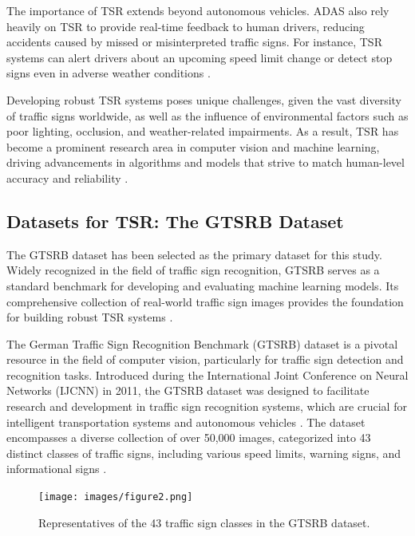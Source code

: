 The importance of TSR extends beyond autonomous vehicles. \ac{ADAS} also rely heavily 
on TSR to provide real-time feedback to human drivers, reducing accidents caused by missed or misinterpreted traffic 
signs. For instance, TSR systems can alert drivers about an upcoming speed limit change or detect stop signs even in 
adverse weather conditions \cite{Zhang2022}. 

Developing robust TSR systems poses unique challenges, given the vast diversity of traffic signs worldwide, as well 
as the influence of environmental factors such as poor lighting, occlusion, and weather-related impairments. As a result, 
TSR has become a prominent research area in computer vision and machine learning, driving advancements in algorithms and
 models that strive to match human-level accuracy and reliability \cite{cite-key2}.

 \subsection{Datasets for TSR: The GTSRB Dataset}

 The \ac{GTSRB} dataset has been selected as the primary dataset for this study.
  Widely recognized in the field of traffic sign recognition, GTSRB serves as a standard benchmark for developing and evaluating
   machine learning models. Its comprehensive collection of real-world traffic sign images provides the foundation for building
    robust TSR systems \cite{STALLKAMP2012323}.


    The German Traffic Sign Recognition Benchmark (GTSRB) dataset is a pivotal resource in the field of computer vision,
     particularly for traffic sign detection and recognition tasks. Introduced during the International Joint Conference
      on Neural Networks (IJCNN) in 2011, the GTSRB dataset was designed to facilitate research and development in traffic 
      sign recognition systems, which are crucial for intelligent transportation systems and autonomous vehicles
       \cite{10.1109/tits.2012.2209421}. The dataset encompasses a diverse collection of over 50,000 images, 
       categorized into 43 distinct classes of traffic signs, including various speed limits, warning signs,
        and informational signs \cite{10.1016/j.neunet.2012.02.023}. 

        \begin{figure}[H]
          \centering
          \texttt{[image: images/figure2.png]}
          \caption{Representatives of the 43 traffic sign classes in the GTSRB dataset.}
          \label{fig:fig2}
      \end{figure}
        
